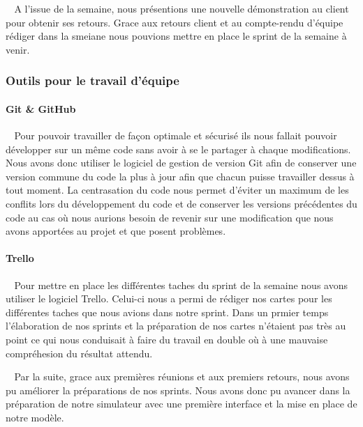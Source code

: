 \documentclass[12pt]{article}
\def\tab{$\>\>\>\>$}
\begin{document}
\tab A l'issue de la semaine, nous présentions une nouvelle démonstration au client pour obtenir ses retours. Grace aux retours client et au compte-rendu d'équipe rédiger dans la smeiane nous pouvions mettre en place le sprint de la semaine à venir.

\newpage

\subsubsection{Outils pour le travail d'équipe}
\paragraph{Git \& GitHub\\}
\tab Pour pouvoir travailler de façon optimale et sécurisé ils nous fallait pouvoir développer sur un même code sans avoir à se le partager à chaque modifications. Nous avons donc utiliser le logiciel de gestion de version Git afin de conserver une version commune du code la plus à jour afin que chacun puisse travailler dessus à tout moment. La centrasation du code nous permet d'éviter un maximum de les conflits lors du développement du code et de conserver les versions précédentes du code au cas où nous aurions besoin de revenir sur une modification que nous avons apportées au projet et que posent problèmes.

\paragraph{Trello\\}
\tab Pour mettre en place les différentes taches du sprint de la semaine nous avons utiliser le logiciel Trello. Celui-ci nous a permi de rédiger nos cartes pour les différentes taches que nous avions dans notre sprint. Dans un prmier temps l'élaboration de nos sprints et la préparation de nos cartes n'étaient pas très au point ce qui nous conduisait à faire du travail en double où à une mauvaise compréhesion du résultat attendu.

\tab Par la suite, grace aux premières réunions et aux premiers retours, nous avons pu améliorer la préparations de nos sprints. Nous avons donc pu avancer dans la préparation de notre simulateur avec une première interface et la mise en place de notre modèle.
\end{document}
